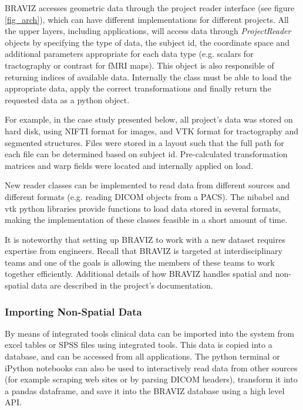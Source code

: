 \documentclass{frontiersHLTH}
\begin{document}
BRAVIZ accesses geometric data through the project reader interface (see figure \ref{fig_arch}), which can have different implementations for different projects. All the upper layers, including applications, will access data through \emph{ProjectReader} objects by specifying the type of data, the subject id, the coordinate space  and additional parameters appropriate for each data type (e.g. scalars for tractography or contrast for fMRI maps). This object is also responsible of returning indices of available data. Internally the class must be able to load the appropriate data, apply the correct transformations and finally return the requested data as a python object. 

For example, in the case study presented below, all project's data was stored on hard disk, using NIFTI format for images, and VTK format for tractography and segmented structures. Files were stored in a layout such that the full path for each file can be determined based on subject id. Pre-calculated transformation matrices and warp fields were located and internally applied on load.

New reader classes can be implemented to read data from different sources and different formats (e.g. reading DICOM objects from a PACS). The nibabel and vtk python libraries provide functions to load data stored in several formats, making the implementation of these classes feasible in a short amount of time.

It is noteworthy that setting up BRAVIZ to work with a new dataset requires expertise from engineers. Recall that BRAVIZ is targeted at interdisciplinary teams and one of the goals is allowing the members of these teams to work together efficiently. Additional details of how BRAVIZ handles spatial and non-spatial data are described in the project's documentation. 

\subsubsection{Importing Non-Spatial Data}

By means of integrated tools clinical data can be imported into the system from excel tables or SPSS files using integrated tools. This data is copied into a database, and can be accessed from all applications. The python terminal or iPython notebooks \cite{perez_ipython:_2007} can also be used to interactively read data from other sources (for example scraping web sites or by parsing DICOM headers), transform it into a pandas dataframe, and save it into the BRAVIZ database using a high level API.
\end{document}
